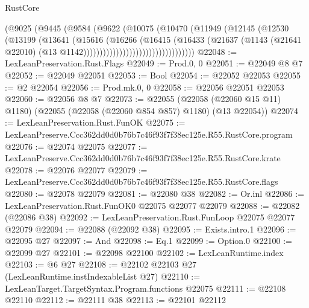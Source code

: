 \begin{lexlean}{RustCore}
\begin{coremodule}
                                    (@9025
                                      (@9445
                                        (@9584
                                          (@9622
                                            (@10075
                                              (@10470
                                                (@11949
                                                  (@12145
                                                    (@12530
                                                      (@13199
                                                        (@13641
                                                          (@15616
                                                            (@16266
                                                              (@16415
                                                                (@16433
                                                                  (@21637
                                                                    (@1143
                                                                      (@21641 @22010)
                                                                      (@13
                                                                        @1142))))))))))))))))))))))))))))))))))
@22048 := LexLeanPreservation.Rust.Flags
@22049 := Prod.{0, 0}
@22051 := @22049 @8 @7
@22052 := @22049 @22051
@22053 := Bool
@22054 := @22052 @22053
@22055 := @2 @22054
@22056 := Prod.mk.{0, 0}
@22058 := @22056 @22051 @22053
@22060 := @22056 @8 @7
@22073 := @22055
    (@22058 (@22060 @15 @11) @1180)
    (@22055 (@22058 (@22060 @854 @857) @1180) (@13 @22054))
@22074 := LexLeanPreservation.Rust.FunOK
@22075 := LexLeanPreserve.Ccc362dd0d0b76b7c46f93f7f38ec125e.R55.RustCore.program
@22076 := @22074 @22075
@22077 := LexLeanPreserve.Ccc362dd0d0b76b7c46f93f7f38ec125e.R55.RustCore.krate
@22078 := @22076 @22077
@22079 := LexLeanPreserve.Ccc362dd0d0b76b7c46f93f7f38ec125e.R55.RustCore.flags
@22080 := @22078 @22079
@22081 := @22080 @38
@22082 := Or.inl
@22086 := LexLeanPreservation.Rust.FunOK0 @22075 @22077 @22079
@22088 := @22082 (@22086 @38)
@22092 := LexLeanPreservation.Rust.FunLoop @22075 @22077 @22079
@22094 := @22088 (@22092 @38)
@22095 := Exists.intro.{1}
@22096 := @22095 @27
@22097 := And
@22098 := Eq.{1}
@22099 := Option.{0}
@22100 := @22099 @27
@22101 := @22098 @22100
@22102 := LexLeanRuntime.index
@22103 := @6 @27
@22108 := @22102 @22103 @27 (LexLeanRuntime.instIndexableList @27)
@22110 := LexLeanTarget.TargetSyntax.Program.functions @22075
@22111 := @22108 @22110
@22112 := @22111 @38
@22113 := @22101 @22112

\end{coremodule}
\end{lexlean}
